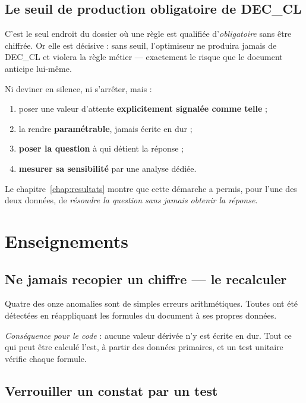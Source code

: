 \subsection{Le seuil de production obligatoire de DEC\_CL}

C'est le seul endroit du dossier où une règle est qualifiée d'\emph{obligatoire} sans être
chiffrée. Or elle est décisive : sans seuil, l'optimiseur ne produira jamais de DEC\_CL et
violera la règle métier --- exactement le risque que le document anticipe lui-même.

\begin{encadre}[title={La démarche adoptée face à une donnée manquante}]
Ni deviner en silence, ni s'arrêter, mais :
\begin{enumerate}
  \item poser une valeur d'attente \textbf{explicitement signalée comme telle} ;
  \item la rendre \textbf{paramétrable}, jamais écrite en dur ;
  \item \textbf{poser la question} à qui détient la réponse ;
  \item \textbf{mesurer sa sensibilité} par une analyse dédiée.
\end{enumerate}

Le chapitre~\ref{chap:resultats} montre que cette démarche a permis, pour l'une des deux
données, de \emph{résoudre la question sans jamais obtenir la réponse}.
\end{encadre}

\section{Enseignements}

\subsection{Ne jamais recopier un chiffre --- le recalculer}

Quatre des onze anomalies sont de simples erreurs arithmétiques. Toutes ont été détectées en
réappliquant les formules du document à ses propres données.

\emph{Conséquence pour le code} : aucune valeur dérivée n'y est écrite en dur. Tout ce qui
peut être calculé l'est, à partir des données primaires, et un test unitaire vérifie chaque
formule.

\subsection{Verrouiller un constat par un test}

